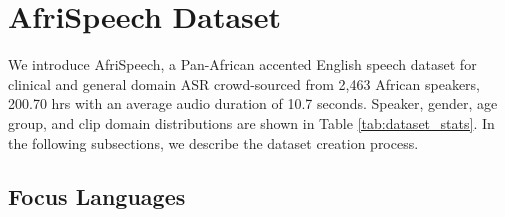 \documentclass[11pt,a4paper]{article}
\begin{document}






\section{AfriSpeech Dataset}


We introduce AfriSpeech, a Pan-African accented English speech dataset for clinical and general domain ASR crowd-sourced from 2,463 African speakers, 200.70 hrs with an average audio duration of 10.7 seconds. Speaker, gender, age group, and clip domain distributions are shown in Table \ref{tab:dataset_stats}. In the following subsections, we describe the dataset creation process.


\subsection{Focus Languages}
\end{document}
